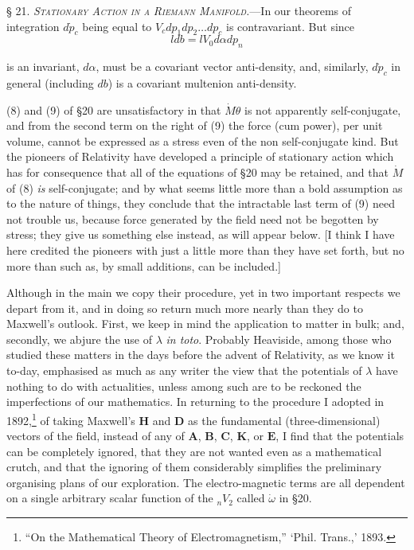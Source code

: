 \documentclass[11pt]{article}
\begin{document}
\noindent\textsc{§ 21. \emph{Stationary Action in a Riemann Manifold.}}---In our theorems of integration $d\dot p_c$ being equal to $V_cd p_1d p_2\ldots d p_c$ is contravariant. But since
\[
  ldb=lV_0d\alpha d p_n
\]

is an invariant, $d\alpha$, must be a covariant vector anti-density, and, similarly, $d\dot p_c$ in general (including $db$) is a covariant multenion anti-density.

\indent (8) and (9) of §20 are unsatisfactory in that $\dot M\theta$ is not apparently self-conjugate, and from the second term on the right of (9) the force (cum power), per unit volume, cannot be expressed as a stress even of the non self-conjugate kind. But the pioneers of Relativity have developed a principle of stationary action which has for consequence that all of the equations of §20 may be retained, and that $\dot M$ of (8) \emph{is} self-conjugate; and by what seems little more than a bold assumption as to the nature of things, they conclude that the intractable last term of (9) need not trouble us, because force generated by the field need not be begotten by stress; they give us something else instead, as will appear below. [I think I have here credited the pioneers with just a little more than they have set forth, but no more than such as, by small additions, can be included.]

\indent Although in the main we copy their procedure, yet in two important respects we depart from it, and in doing so return much more nearly than they do to Maxwell's outlook. First, we keep in mind the application to matter in bulk; and, secondly, we abjure the use of $\lambda$ \emph{in toto}. Probably Heaviside, among those who studied these matters in the days before the advent of Relativity, as we know it to-day, emphasised as much as any writer the view that the potentials of $\lambda$ have nothing to do with actualities, unless among such are to be reckoned the imperfections of our mathematics. In returning to the procedure I adopted in 1892,\footnote{``On the Mathematical Theory of Electromagnetism,'' `Phil. Trans.,' 1893.} of taking Maxwell's $\mathbf{H}$ and $\mathbf{D}$ as the fundamental (three-dimensional) vectors of the field, instead of any of $\mathbf{A}$, $\mathbf{B}$, $\mathbf{C}$, $\mathbf{K}$, or $\mathbf{E}$, I find that the potentials can be completely ignored, that they are not wanted even as a mathematical crutch, and that the ignoring of them considerably simplifies the preliminary organising plans of our exploration. The electro-magnetic terms are all dependent on a single arbitrary scalar function of the ${}_nV_2$ called $\dot\omega$ in §20.
\end{document}
